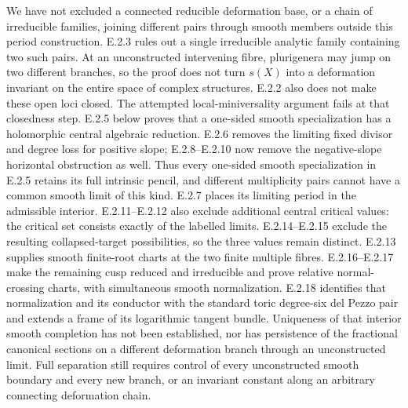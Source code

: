 \begin{problem}
We have not excluded a connected reducible deformation base,
or a chain of irreducible families, joining different pairs
through smooth members outside this period construction.
E.2.3 rules out a single irreducible analytic family containing
two such pairs.  At an unconstructed intervening fibre,
plurigenera may jump on two different branches, so the proof
does not turn $s(X)$ into a deformation invariant on the
entire space of complex structures.  E.2.2 also does not
make these open loci closed.  The attempted local-miniversality
argument fails at that closedness step.  E.2.5 below proves
that a one-sided smooth specialization has a holomorphic
central algebraic reduction.  E.2.6 removes the limiting
fixed divisor and degree loss for positive slope; E.2.8--E.2.10
now remove the negative-slope horizontal obstruction as well.
Thus every one-sided smooth specialization in E.2.5 retains
its full intrinsic pencil, and different multiplicity pairs
cannot have a common smooth limit of this kind.
E.2.7 places its limiting period in the admissible interior.
E.2.11--E.2.12 also exclude additional central critical
values: the critical set consists exactly of the labelled
limits.  E.2.14--E.2.15 exclude the resulting collapsed-target
possibilities, so the three values remain distinct.
E.2.13 supplies smooth finite-root charts at the two
finite multiple fibres.
E.2.16--E.2.17 make the remaining cusp reduced and
irreducible and prove relative normal-crossing charts,
with simultaneous smooth normalization.
E.2.18 identifies that normalization and its conductor
with the standard toric degree-six del Pezzo pair and
extends a frame of its logarithmic tangent bundle.
Uniqueness of that interior smooth completion has not been
established, nor has persistence of the fractional canonical
sections on a different deformation branch through an
unconstructed limit.  Full separation still requires
control of every unconstructed smooth boundary and every
new branch, or an invariant constant along an arbitrary
connecting deformation chain.
\end{problem}















